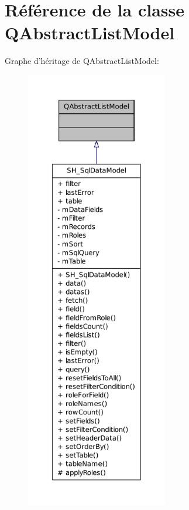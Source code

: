 \hypertarget{classQAbstractListModel}{\section{Référence de la classe Q\-Abstract\-List\-Model}
\label{classQAbstractListModel}
}


Graphe d'héritage de Q\-Abstract\-List\-Model\-:\nopagebreak
\begin{figure}[H]
\begin{center}
\leavevmode
\includegraphics[height=550pt]{classQAbstractListModel__inherit__graph}
\end{center}
\end{figure}


